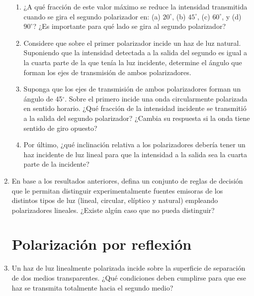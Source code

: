 \documentclass[11pt,spanish]{article}
\begin{document}
\begin{enumerate}
\begin{enumerate}
        \item ¿A qué fracción de este valor máximo se reduce la intensidad
        transmitida cuando se gira el segundo polarizador en: (a) $20^{\circ}$,
        (b) $45^{\circ}$, (c) $60^{\circ}$, y (d) $90^{\circ}$? ¿Es importante
        para qué lado se gira al segundo polarizador?
    
        \item Considere que sobre el primer polarizador incide un haz de luz
        natural. Suponiendo que la intensidad detectada a la salida del segundo
        es igual a la cuarta parte de la que tenía la luz incidente, determine
        el ángulo que forman los ejes de transmisión de ambos polarizadores.
        
        \item Suponga que los ejes de transmisión de ambos polarizadores forman
        un ángulo de 45$^{\circ}$. Sobre el primero incide una onda
        circularmente polarizada en sentido horario. ¿Qué fracción de la
        intensidad incidente se transmitió a la salida del segundo polarizador?
        ¿Cambia su respuesta si la onda tiene sentido de giro opuesto?
        
        \item Por último, ¿qué inclinación relativa a los polarizadores debería
        tener un haz incidente de luz lineal para que la intensidad a la salida
        sea la cuarta parte de la incidente?
        
    \end{enumerate}


    \item En base a los resultados anteriores, defina un conjunto de reglas de
    decisión que le permitan distinguir experimentalmente fuentes emisoras de
    los distintos tipos de luz (lineal, circular, elíptico y natural) empleando
    polarizadores lineales. ¿Existe algún caso que no pueda distinguir?
    
    
\section*{Polarización por reflexión}


    \item Un haz de luz linealmente polarizada incide sobre la superficie de
    separación de dos medios transparentes. ¿Qué condiciones deben cumplirse
    para que ese haz se transmita totalmente hacia el segundo medio? 


\end{enumerate}
\end{document}
